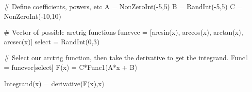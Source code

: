\begin{sagesilent}
# Define coefficients, powers, etc
A = NonZeroInt(-5,5)
B = RandInt(-5,5)
C = NonZeroInt(-10,10)


# Vector of possible arctrig functions
funcvec = [arcsin(x), arccos(x), arctan(x), arcsec(x)]
select = RandInt(0,3)

# Select our arctrig function, then take the derivative to get the integrand.
Func1 = funcvec[select]
F(x) = C*Func1(A*x + B)

Integrand(x) = derivative(F(x),x)

\end{sagesilent}




